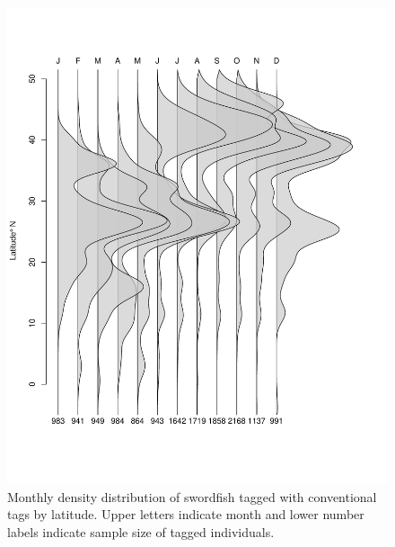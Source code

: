 \begin{figure}[htbp]
\centering
\includegraphics[width=\textwidth]{images/A4_FigS4.pdf}
\caption[Monthly latitude density distribution of
swordfish tagged with conventional tags]{Monthly density distribution of
swordfish tagged with conventional tags by latitude. Upper letters
indicate month and lower number labels indicate sample size of tagged
individuals.}
\label{fig:a4f4}
\end{figure}

